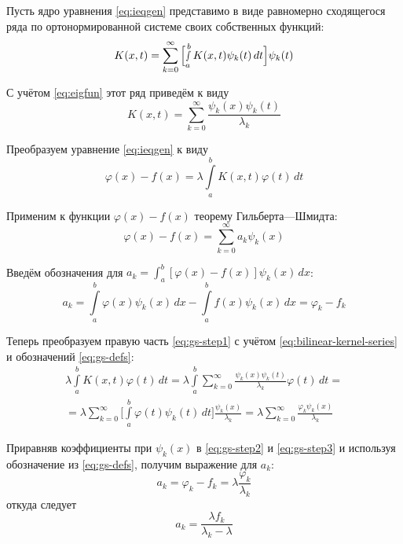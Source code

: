\documentclass[11pt]{article}
\numberwithin{equation}{section}
\renewcommand{\phi}{\varphi}
\newcommand{\intl}{\int\limits}
\begin{document}
Пусть ядро уравнения \eqref{eq:ieqgen} представимо в виде равномерно
сходящегося ряда по ортонормированной системе своих собственных
функций:
\begin{equation}
  K(x, t) = \sum_{k=0}^{\infty}{\Bigl [ \smallint_a^b{K(x, t)\psi_k(t)\,
      dt} \Bigr ] \psi_k(t)}
\end{equation}

С учётом \eqref{eq:eigfun} этот ряд приведём к виду
\begin{equation}
  \label{eq:bilinear-kernel-series}
  K(x, t) = \sum_{k=0}^{\infty}{\frac{\psi_k(x)\psi_k(t)}{\lambda_k}}
\end{equation}

Преобразуем уравнение \eqref{eq:ieqgen} к виду
\begin{equation}
  \label{eq:gs-step1}
  \phi(x)-f(x) = \lambda \intl_a^b{K(x, t) \phi(t)\,dt}
\end{equation}

Применим к функции $\phi(x)-f(x)$ теорему Гильберта—Шмидта:
\begin{equation}
  \label{eq:gs-step2}
  \phi(x)-f(x) = \sum_{k=0}^{\infty}{a_k \psi_k(x)}
\end{equation}

Введём обозначения для $a_k = \int_a^b{[\phi(x)-f(x)]\psi_k(x)\,dx}$:
\begin{equation}
  \label{eq:gs-defs}
  a_k = \intl_a^b{\phi(x)\psi_k(x)\,dx} - \intl_a^b{f(x)\psi_k(x)\,dx}
  = \phi_k-f_k
\end{equation}

Теперь преобразуем правую часть \eqref{eq:gs-step1} с учётом
\eqref{eq:bilinear-kernel-series} и обозначений \eqref{eq:gs-defs}:
\begin{multline}
  \label{eq:gs-step3}
  \lambda\intl_a^b{K(x, t) \phi(t)\,dt} =
  \lambda \intl_a^b\sum_{k=0}^\infty{\frac{\psi_k(x)\psi_k(t)}{\lambda_k}\phi(t)\,dt} =\\
  = \lambda \sum_{k=0}^\infty \biggl [ \intl_a^b{\phi(t)\psi_k(t)\,dt}
  \biggr ] \frac{\psi_k(x)}{\lambda_k} = \lambda \sum_{k=0}^\infty
  \frac{\phi_k \psi_k(x)}{\lambda_k}
\end{multline}

Приравняв коэффициенты при $\psi_k(x)$ в \eqref{eq:gs-step2} и
\eqref{eq:gs-step3} и используя обозначение из \eqref{eq:gs-defs},
получим выражение для $a_k$:
\begin{equation*}
  a_k = \phi_k-f_k = \lambda\frac{\phi_k}{\lambda_k}
\end{equation*}
откуда следует
\begin{equation}
  a_k = \frac{\lambda f_k}{\lambda_k - \lambda}
\end{equation}
\end{document}
